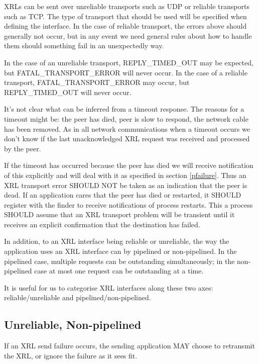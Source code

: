 \documentclass[11pt]{article}
\begin{document}
XRLs can be sent over unreliable transports such as UDP or reliable
transports such as TCP. The type of transport that should be used will
be specified when defining the interface. In the case of reliable
transport, the errors above should generally not occur, but in any
event we need general rules about how to handle them should something
fail in an unexpectedly way.

In the case of an unreliable transport, REPLY\_TIMED\_OUT may be
expected, but 
\newline
FATAL\_TRANSPORT\_ERROR will never occur.  In the case
of a reliable transport, FATAL\_TRANSPORT\_ERROR may occur, but
REPLY\_TIMED\_OUT will never occur.

It's not clear what can be inferred from a timeout response. The
reasons for a timeout might be: the peer has died, peer is slow to
respond, the network cable has been removed. As in all network
communications when a timeout occurs we don't know if the last
unacknowledged XRL request was received and processed by the peer.

If the timeout has occurred because the peer has died we will receive
notification of this explicitly and will deal with it as specified in
section \ref{pfailure}.  Thus an XRL transport error SHOULD NOT be
taken as an indication that the peer is dead.  If an application cares
that the peer has died or restarted, it SHOULD register with the
finder to receive notifications of process restarts.  This a process
SHOULD assume that an XRL transport problem will be transient until it
receives an explicit confirmation that the destination has failed. 

In addition, to an XRL interface being reliable or unreliable, the way
the application uses an XRL interface can by pipelined or
non-pipelined.  In the pipelined case, multiple requests can be
outstanding simultaneously; in the non-pipelined case at most one
request can be outstanding at a time.

It is useful for us to categorise XRL interfaces along these two axes:
reliable/unreliable and pipelined/non-pipelined.

\subsection*{Unreliable, Non-pipelined}

If an XRL send failure occurs, the sending application MAY choose to
retransmit the XRL, or ignore the failure as it sees fit.  
\end{document}

